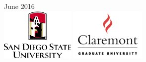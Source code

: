 \documentclass[11pt]{Thesis} %
\begin{document}
\begin{titlepage}
\begin{center}
{\large {June 2016}}\\[2cm] %
\includegraphics[height=2.5cm]{sdsu.eps} \hskip 2cm \includegraphics[height=2.5cm]{cgu178.png}%
 
\vfill
\end{center}

\end{titlepage}


%
\newpage
\thispagestyle{empty}
\mbox{}
\clearpage

\end{document}
